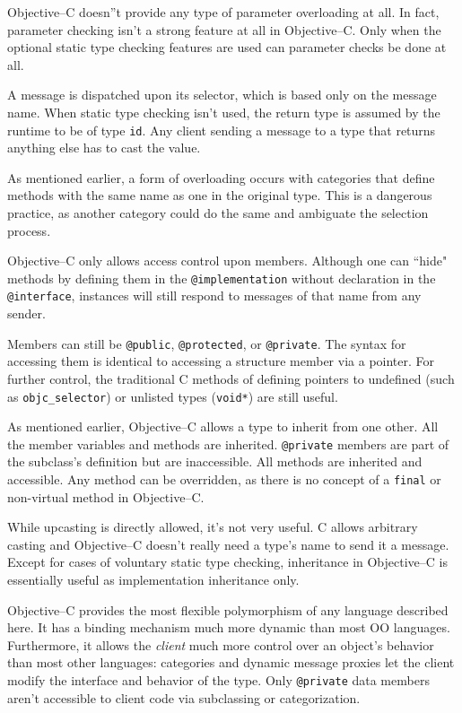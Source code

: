 Objective--C doesn''t provide any type of parameter overloading at all. In
fact, parameter checking isn't a strong feature at all in Objective--C. Only
when the optional static type checking features are used can parameter checks
be done at all.

A message is dispatched upon its selector, which is based only on the message
name. When static type checking isn't used, the return type is assumed by the
runtime to be of type \texttt{id}. Any client sending a message to a type that
returns anything else has to cast the value.

As mentioned earlier, a form of overloading occurs with categories that define
methods with the same name as one in the original type. This is a dangerous
practice, as another category could do the same and ambiguate the selection
process.

Objective--C only allows access control upon members. Although one can ``hide"
methods by defining them in the \texttt{@implementation} without declaration
in the \texttt{@interface}, instances will still respond to messages of that
name from any sender.

Members can still be \texttt{@public}, \texttt{@protected}, or
\texttt{@private}. The syntax for accessing them is identical to accessing a
structure member via a pointer. For further control, the traditional C methods
of defining pointers to undefined (such as \texttt{objc\_selector}) or
unlisted types (\texttt{void*}) are still useful.

As mentioned earlier, Objective--C allows a type to inherit from one other.
All the member variables and methods are inherited. \texttt{@private} members
are part of the subclass's definition but are inaccessible. All methods are
inherited and accessible. Any method can be overridden, as there is no concept
of a \texttt{final} or non-virtual method in Objective--C.

While upcasting is directly allowed, it's not very useful. C allows arbitrary
casting and Objective--C doesn't really need a type's name to send it a
message. Except for cases of voluntary static type checking, inheritance in
Objective--C is essentially useful as implementation inheritance only.

Objective--C provides the most flexible polymorphism of any language described
here. It has a binding mechanism much more dynamic than most OO languages.
Furthermore, it allows the \emph{client} much more control over an object's
behavior than most other languages: categories and dynamic message proxies let
the client modify the interface and behavior of the type. Only
\texttt{@private} data members aren't accessible to client code via
subclassing or categorization.

